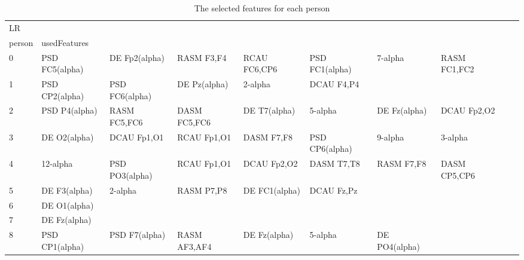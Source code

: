 \begin{landscape}
\begin{table}[]
\centering
\caption{The selected features for each person}
\begin{tabular}{l|llllllll}
LR       &                &                &                &                &                &                &               &                &               &               \\
person   & usedFeatures   &                &                &                &                &                &               &                &               &               \\
0        & PSD FC5(alpha) & DE Fp2(alpha)  & RASM F3,F4     & RCAU FC6,CP6   & PSD FC1(alpha) & 7-alpha        & RASM FC1,FC2  &                &               &               \\
1        & PSD CP2(alpha) & PSD FC6(alpha) & DE Pz(alpha)   & 2-alpha        & DCAU F4,P4     &                &               &                &               &               \\
2        & PSD P4(alpha)  & RASM FC5,FC6   & DASM FC5,FC6   & DE T7(alpha)   & 5-alpha        & DE Fz(alpha)   & DCAU Fp2,O2   &                &               &               \\
3        & DE O2(alpha)   & DCAU Fp1,O1    & RCAU Fp1,O1    & DASM F7,F8     & PSD CP6(alpha) & 9-alpha        & 3-alpha       &                &               &               \\
4        & 12-alpha       & PSD PO3(alpha) & RCAU Fp1,O1    & DCAU Fp2,O2    & DASM T7,T8     & RASM F7,F8     & DASM CP5,CP6  &                &               &               \\
5        & DE F3(alpha)   & 2-alpha        & RASM P7,P8     & DE FC1(alpha)  & DCAU Fz,Pz     &                &               &                &               &               \\
6        & DE O1(alpha)   &                &                &                &                &                &               &                &               &               \\
7        & DE Fz(alpha)   &                &                &                &                &                &               &                &               &               \\
8        & PSD CP1(alpha) & PSD F7(alpha)  & RASM AF3,AF4   & DE Fz(alpha)   & 5-alpha        & DE PO4(alpha)  &               &                &               &               \\

\end{tabular}
\end{table}
\end{landscape}

